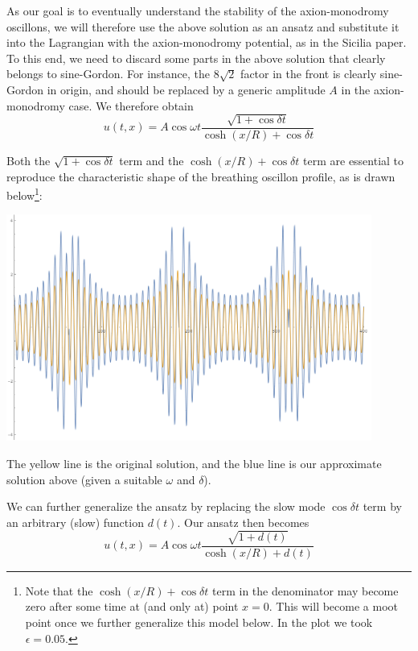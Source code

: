\documentclass{report}
\begin{document}
As our goal is to eventually understand the stability of the axion-monodromy oscillons, we will therefore use the above solution as an ansatz and substitute it into the Lagrangian with the axion-monodromy potential, as in the Sicilia paper. To this end, we need to discard some parts in the above solution that clearly belongs to sine-Gordon. For instance, the $8\sqrt{2}$ factor in the front is clearly sine-Gordon in origin, and should be replaced by a generic amplitude $A$ in the axion-monodromy case. We therefore obtain
\begin{equation}
  u(t,x) = A \cos\omega t \frac{\sqrt{1+\cos\delta t}}{\cosh (x/R) + \cos \delta t}
\end{equation}

Both the $\sqrt{1+\cos\delta t}$ term and the $\cosh (x/R) + \cos \delta t$ term are essential to reproduce the characteristic shape of the breathing oscillon profile, as is drawn below\footnote{Note that the $\cosh (x/R) + \cos \delta t$ term in the denominator may become zero after some time at (and only at) point $x=0$. This will become a moot point once we further generalize this model below. In the plot we took $\epsilon=0.05$.}:

\begin{center}
  \includegraphics[width=0.9\textwidth]{plot/small-compare.png}
\end{center}

The yellow line is the original solution, and the blue line is our approximate solution above (given a suitable $\omega$ and $\delta$).

We can further generalize the ansatz by replacing the slow mode $\cos\delta t$ term by an arbitrary (slow) function $d(t)$. Our ansatz then becomes
\begin{equation}
  u(t,x) = A\cos\omega t \frac{\sqrt{1+d(t)}}{\cosh (x/R) + d(t)}
\end{equation}
\end{document}
